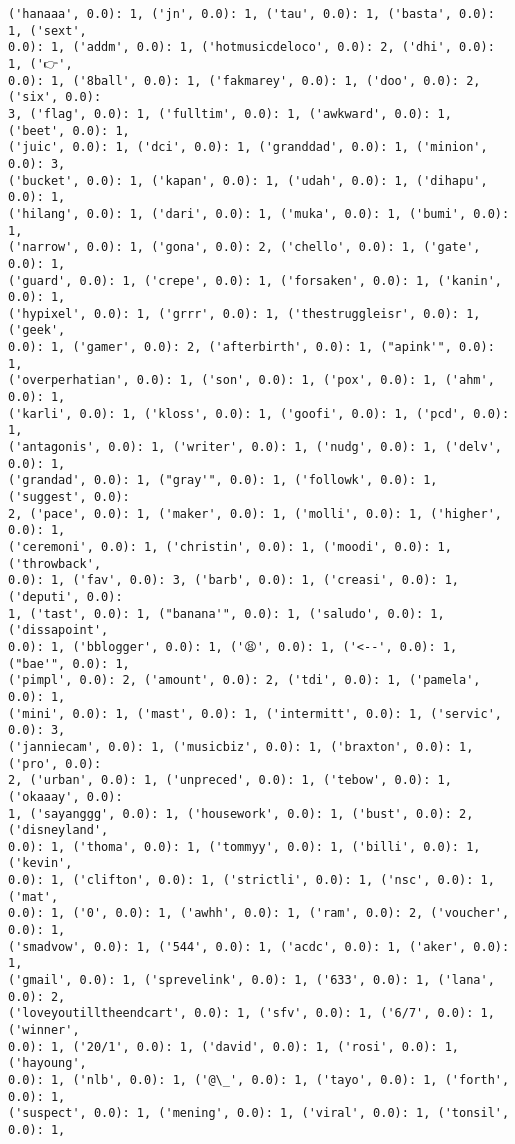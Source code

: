 \documentclass[11pt]{article}
\begin{document}
\begin{Verbatim}[commandchars=\\\{\}]
('hanaaa', 0.0): 1, ('jn', 0.0): 1, ('tau', 0.0): 1, ('basta', 0.0): 1, ('sext',
0.0): 1, ('addm', 0.0): 1, ('hotmusicdeloco', 0.0): 2, ('dhi', 0.0): 1, ('👉',
0.0): 1, ('8ball', 0.0): 1, ('fakmarey', 0.0): 1, ('doo', 0.0): 2, ('six', 0.0):
3, ('flag', 0.0): 1, ('fulltim', 0.0): 1, ('awkward', 0.0): 1, ('beet', 0.0): 1,
('juic', 0.0): 1, ('dci', 0.0): 1, ('granddad', 0.0): 1, ('minion', 0.0): 3,
('bucket', 0.0): 1, ('kapan', 0.0): 1, ('udah', 0.0): 1, ('dihapu', 0.0): 1,
('hilang', 0.0): 1, ('dari', 0.0): 1, ('muka', 0.0): 1, ('bumi', 0.0): 1,
('narrow', 0.0): 1, ('gona', 0.0): 2, ('chello', 0.0): 1, ('gate', 0.0): 1,
('guard', 0.0): 1, ('crepe', 0.0): 1, ('forsaken', 0.0): 1, ('kanin', 0.0): 1,
('hypixel', 0.0): 1, ('grrr', 0.0): 1, ('thestruggleisr', 0.0): 1, ('geek',
0.0): 1, ('gamer', 0.0): 2, ('afterbirth', 0.0): 1, ("apink'", 0.0): 1,
('overperhatian', 0.0): 1, ('son', 0.0): 1, ('pox', 0.0): 1, ('ahm', 0.0): 1,
('karli', 0.0): 1, ('kloss', 0.0): 1, ('goofi', 0.0): 1, ('pcd', 0.0): 1,
('antagonis', 0.0): 1, ('writer', 0.0): 1, ('nudg', 0.0): 1, ('delv', 0.0): 1,
('grandad', 0.0): 1, ("gray'", 0.0): 1, ('followk', 0.0): 1, ('suggest', 0.0):
2, ('pace', 0.0): 1, ('maker', 0.0): 1, ('molli', 0.0): 1, ('higher', 0.0): 1,
('ceremoni', 0.0): 1, ('christin', 0.0): 1, ('moodi', 0.0): 1, ('throwback',
0.0): 1, ('fav', 0.0): 3, ('barb', 0.0): 1, ('creasi', 0.0): 1, ('deputi', 0.0):
1, ('tast', 0.0): 1, ("banana'", 0.0): 1, ('saludo', 0.0): 1, ('dissapoint',
0.0): 1, ('bblogger', 0.0): 1, ('😫', 0.0): 1, ('<--', 0.0): 1, ("bae'", 0.0): 1,
('pimpl', 0.0): 2, ('amount', 0.0): 2, ('tdi', 0.0): 1, ('pamela', 0.0): 1,
('mini', 0.0): 1, ('mast', 0.0): 1, ('intermitt', 0.0): 1, ('servic', 0.0): 3,
('janniecam', 0.0): 1, ('musicbiz', 0.0): 1, ('braxton', 0.0): 1, ('pro', 0.0):
2, ('urban', 0.0): 1, ('unpreced', 0.0): 1, ('tebow', 0.0): 1, ('okaaay', 0.0):
1, ('sayanggg', 0.0): 1, ('housework', 0.0): 1, ('bust', 0.0): 2, ('disneyland',
0.0): 1, ('thoma', 0.0): 1, ('tommyy', 0.0): 1, ('billi', 0.0): 1, ('kevin',
0.0): 1, ('clifton', 0.0): 1, ('strictli', 0.0): 1, ('nsc', 0.0): 1, ('mat',
0.0): 1, ('0', 0.0): 1, ('awhh', 0.0): 1, ('ram', 0.0): 2, ('voucher', 0.0): 1,
('smadvow', 0.0): 1, ('544', 0.0): 1, ('acdc', 0.0): 1, ('aker', 0.0): 1,
('gmail', 0.0): 1, ('sprevelink', 0.0): 1, ('633', 0.0): 1, ('lana', 0.0): 2,
('loveyoutilltheendcart', 0.0): 1, ('sfv', 0.0): 1, ('6/7', 0.0): 1, ('winner',
0.0): 1, ('20/1', 0.0): 1, ('david', 0.0): 1, ('rosi', 0.0): 1, ('hayoung',
0.0): 1, ('nlb', 0.0): 1, ('@\_', 0.0): 1, ('tayo', 0.0): 1, ('forth', 0.0): 1,
('suspect', 0.0): 1, ('mening', 0.0): 1, ('viral', 0.0): 1, ('tonsil', 0.0): 1,

\end{Verbatim}
\end{document}
